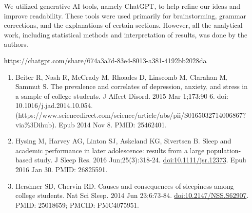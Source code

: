 \documentclass[
  letterpaper,
  DIV=11,
  numbers=noendperiod]{scrartcl}
\begin{document}
We utilized generative AI tools, namely ChatGPT, to help refine our
ideas and improve readability. These tools were used primarily for
brainstorming, grammar corrections, and the explanations of certain
sections. However, all the analytical work, including statistical
methods and interpretation of results, was done by the authors.

https://chatgpt.com/share/674a3a7d-83e4-8013-a381-4192bb2028da

\begin{enumerate}
\def\labelenumi{\arabic{enumi}.}
\item
  Beiter R, Nash R, McCrady M, Rhoades D, Linscomb M, Clarahan M, Sammut
  S. The prevalence and correlates of depression, anxiety, and stress in
  a sample of college students. J Affect Disord. 2015 Mar 1;173:90-6.
  doi:
  10.1016/j.jad.2014.10.054.(https://www.sciencedirect.com/science/article/abs/pii/S0165032714006867?via\%3Dihub).
  Epub 2014 Nov 8. PMID: 25462401.
\item
  Hysing M, Harvey AG, Linton SJ, Askeland KG, Sivertsen B. Sleep and
  academic performance in later adolescence: results from a large
  population-based study. J Sleep Res. 2016 Jun;25(3):318-24.
  \href{https://pubmed.ncbi.nlm.nih.gov/26825591/}{doi:10.1111/jsr.12373}.
  Epub 2016 Jan 30. PMID: 26825591.
\item
  Hershner SD, Chervin RD. Causes and consequences of sleepiness among
  college students. Nat Sci Sleep. 2014 Jun 23;6:73-84.
  \href{https://pmc.ncbi.nlm.nih.gov/articles/PMC4075951/}{doi:10.2147/NSS.S62907}.
  PMID: 25018659; PMCID: PMC4075951.
\end{enumerate}
\end{document}
